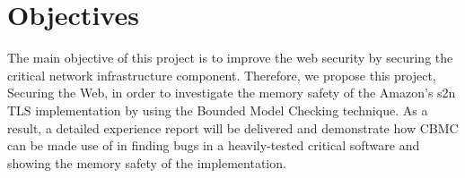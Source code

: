 







\section{Objectives}
The main objective of this project is to improve the web security by securing the critical network infrastructure component. Therefore, we propose this project, Securing the Web, in order to investigate the memory safety of the Amazon's s2n TLS implementation by using the Bounded Model Checking technique. As a result, a detailed experience report will be delivered and demonstrate how CBMC can be made use of in finding bugs in a heavily-tested critical software and showing the memory safety of the implementation.

